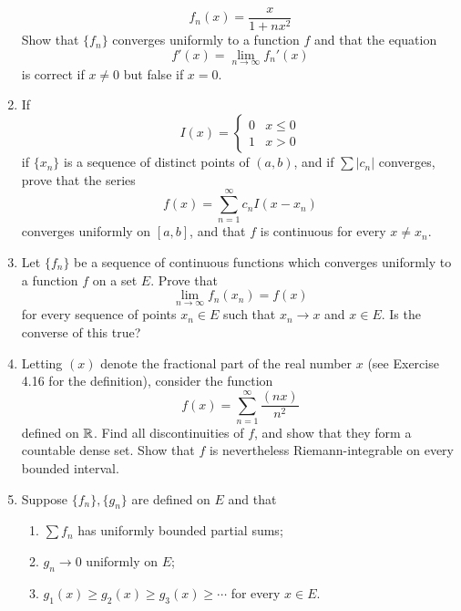 \documentclass[../psets.tex]{subfiles}
\begin{document}
\begin{enumerate}[label={\textbf{\arabic*.}}]
\begin{equation*}
        f_n(x) = \frac{x}{1+nx^2}
    \end{equation*}
    Show that $\{f_n\}$ converges uniformly to a function $f$ and that the equation
    \begin{equation*}
        f'(x) = \lim_{n\to\infty}f_n'(x)
    \end{equation*}
    is correct if $x\neq 0$ but false if $x=0$.
    \item If
    \begin{equation*}
        I(x) =
        \begin{cases}
            0 & x\leq 0\\
            1 & x>0
        \end{cases}
    \end{equation*}
    if $\{x_n\}$ is a sequence of distinct points of $(a,b)$, and if $\sum|c_n|$ converges, prove that the series
    \begin{equation*}
        f(x) = \sum_{n=1}^\infty c_nI(x-x_n)
    \end{equation*}
    converges uniformly on $[a,b]$, and that $f$ is continuous for every $x\neq x_n$.
    \item Let $\{f_n\}$ be a sequence of continuous functions which converges uniformly to a function $f$ on a set $E$. Prove that
    \begin{equation*}
        \lim_{n\to\infty}f_n(x_n) = f(x)
    \end{equation*}
    for every sequence of points $x_n\in E$ such that $x_n\to x$ and $x\in E$. Is the converse of this true?
    \item Letting $(x)$ denote the fractional part of the real number $x$ (see Exercise 4.16 for the definition), consider the function
    \begin{equation*}
        f(x) = \sum_{n=1}^\infty\frac{(nx)}{n^2}
    \end{equation*}
    defined on $\mathbb{R}$. Find all discontinuities of $f$, and show that they form a countable dense set. Show that $f$ is nevertheless Riemann-integrable on every bounded interval.
    \item Suppose $\{f_n\},\{g_n\}$ are defined on $E$ and that
    \begin{enumerate}
        \item $\sum f_n$ has uniformly bounded partial sums;
        \item $g_n\to 0$ uniformly on $E$;
        \item $g_1(x)\geq g_2(x)\geq g_3(x)\geq\cdots$ for every $x\in E$.
    \end{enumerate}

\end{enumerate}
\end{document}
